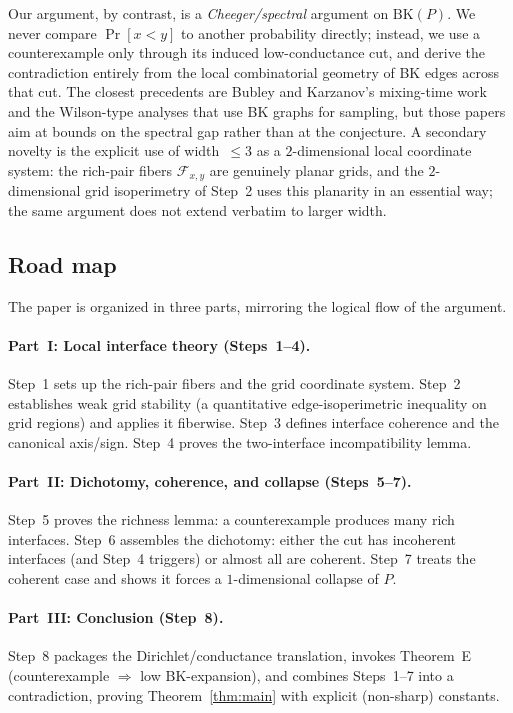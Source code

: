 \documentclass[11pt]{article}
\theoremstyle{definition}
\theoremstyle{remark}
\newcommand{\Fxy}{\mathcal{F}_{x,y}}
\newcommand{\BK}{\mathrm{BK}}
\begin{document}
Our argument, by contrast, is a \emph{Cheeger/spectral} argument on
$\BK(P)$.  We never compare $\Pr[x<y]$ to another probability
directly; instead, we use a counterexample only through its induced
low-conductance cut, and derive the contradiction entirely from the
local combinatorial geometry of BK edges across that cut.  The
closest precedents are Bubley and Karzanov's
mixing-time work~\cite{BubleyKarzanov1998} and the Wilson-type
analyses that use BK graphs for sampling, but those papers aim at
bounds on the spectral gap rather than at the
conjecture.  A secondary novelty is the explicit use of
width~$\le 3$ as a $2$-dimensional local coordinate system: the
rich-pair fibers $\Fxy$ are genuinely planar grids, and the
$2$-dimensional grid isoperimetry of Step~2 uses this planarity in an
essential way; the same argument does not extend verbatim to larger
width.

\subsection{Road map}

The paper is organized in three parts, mirroring the logical flow of
the argument.

\paragraph{Part~I: Local interface theory (Steps~1--4).}
Step~1 sets up the rich-pair fibers and the grid coordinate system.
Step~2 establishes weak grid stability (a quantitative edge-isoperimetric
inequality on grid regions) and applies it fiberwise.  Step~3 defines
interface coherence and the canonical axis/sign.  Step~4 proves the
two-interface incompatibility lemma.

\paragraph{Part~II: Dichotomy, coherence, and collapse (Steps~5--7).}
Step~5 proves the richness lemma: a counterexample produces many rich
interfaces.  Step~6 assembles the dichotomy: either the cut has
incoherent interfaces (and Step~4 triggers) or almost all are coherent.
Step~7 treats the coherent case and shows it forces a $1$-dimensional
collapse of $P$.

\paragraph{Part~III: Conclusion (Step~8).}
Step~8 packages the Dirichlet/conductance translation, invokes
Theorem~E (counterexample $\Rightarrow$ low BK-expansion), and
combines Steps~1--7 into a contradiction, proving
Theorem~\ref{thm:main} with explicit (non-sharp) constants.
\end{document}
